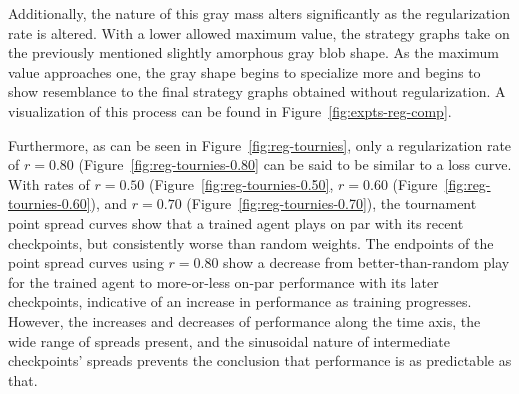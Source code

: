 Additionally,
the nature of this gray mass alters significantly as the regularization rate is
altered.
%
With a lower allowed maximum value,
the strategy graphs take on the previously mentioned slightly amorphous gray
blob shape.
%
As the maximum value approaches one,
the gray shape begins to specialize more and begins to show resemblance to the
final strategy graphs obtained without regularization.
%
A visualization of this process can be found in
Figure~\ref{fig:expts-reg-comp}.



Furthermore,
as can be seen in Figure~\ref{fig:reg-tournies},
only a regularization rate of $r = 0.80$ (Figure~\ref{fig:reg-tournies-0.80}
can be said to be similar to a loss curve.
%
With rates of $r=0.50$ (Figure~\ref{fig:reg-tournies-0.50},
$r = 0.60$ (Figure~\ref{fig:reg-tournies-0.60}),
and $r = 0.70$ (Figure~\ref{fig:reg-tournies-0.70}),
the tournament point spread curves show that a trained agent plays on par with
its recent checkpoints,
but consistently worse than random weights.
%
The endpoints of the point spread curves using $r = 0.80$
show a decrease from better-than-random play for the trained agent
to more-or-less on-par performance with its later checkpoints,
indicative of an increase in performance as training progresses.
%
However,
the increases and decreases of performance along the time axis,
the wide range of spreads present,
and the sinusoidal nature of intermediate checkpoints' spreads
prevents the conclusion that performance is as predictable as that.

